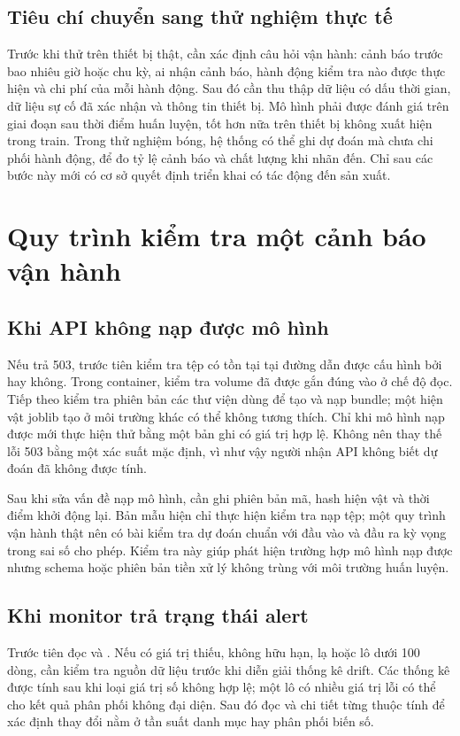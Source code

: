 \section{Tiêu chí chuyển sang thử nghiệm thực tế}
Trước khi thử trên thiết bị thật, cần xác định câu hỏi vận hành: cảnh báo trước bao nhiêu giờ hoặc chu kỳ, ai nhận cảnh báo, hành động kiểm tra nào được thực hiện và chi phí của mỗi hành động. Sau đó cần thu thập dữ liệu có dấu thời gian, dữ liệu sự cố đã xác nhận và thông tin thiết bị. Mô hình phải được đánh giá trên giai đoạn sau thời điểm huấn luyện, tốt hơn nữa trên thiết bị không xuất hiện trong train. Trong thử nghiệm bóng, hệ thống có thể ghi dự đoán mà chưa chi phối hành động, để đo tỷ lệ cảnh báo và chất lượng khi nhãn đến. Chỉ sau các bước này mới có cơ sở quyết định triển khai có tác động đến sản xuất.

\chapter{Quy trình kiểm tra một cảnh báo vận hành}
\section{Khi API không nạp được mô hình}
Nếu  trả 503, trước tiên kiểm tra tệp  có tồn tại tại đường dẫn được cấu hình bởi  hay không. Trong container, kiểm tra volume  đã được gắn đúng vào  ở chế độ đọc. Tiếp theo kiểm tra phiên bản các thư viện dùng để tạo và nạp bundle; một hiện vật joblib tạo ở môi trường khác có thể không tương thích. Chỉ khi mô hình nạp được mới thực hiện thử  bằng một bản ghi có giá trị hợp lệ. Không nên thay thế lỗi 503 bằng một xác suất mặc định, vì như vậy người nhận API không biết dự đoán đã không được tính.

Sau khi sửa vấn đề nạp mô hình, cần ghi phiên bản mã, hash hiện vật và thời điểm khởi động lại. Bản mẫu hiện chỉ thực hiện kiểm tra nạp tệp; một quy trình vận hành thật nên có bài kiểm tra dự đoán chuẩn với đầu vào và đầu ra kỳ vọng trong sai số cho phép. Kiểm tra này giúp phát hiện trường hợp mô hình nạp được nhưng schema hoặc phiên bản tiền xử lý không trùng với môi trường huấn luyện.

\section{Khi monitor trả trạng thái alert}
Trước tiên đọc  và . Nếu có giá trị thiếu, không hữu hạn,  lạ hoặc lô dưới 100 dòng, cần kiểm tra nguồn dữ liệu trước khi diễn giải thống kê drift. Các thống kê được tính sau khi loại giá trị số không hợp lệ; một lô có nhiều giá trị lỗi có thể cho kết quả phân phối không đại diện. Sau đó đọc  và chi tiết từng thuộc tính để xác định thay đổi nằm ở tần suất danh mục hay phân phối biến số.

